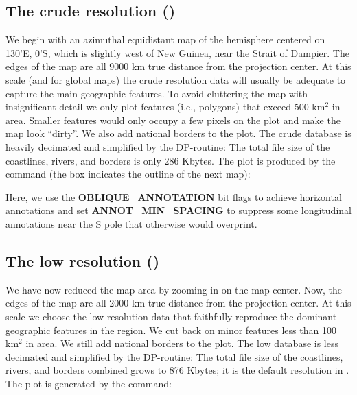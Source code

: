  

\subsection{The crude resolution ()} 

We begin with an azimuthal equidistant map of the hemisphere
centered on 130'E, 0'S, which is slightly west
of New Guinea, near the Strait of Dampier.  The edges of the
map are all 9000 km true distance from the projection center.
At this scale (and for global maps) the crude resolution data
will usually be adequate to capture the main geographic features.
To avoid cluttering the map with insignificant detail we only
plot features (i.e., polygons) that exceed 500 km$^2$ in area.
Smaller features would only occupy a few pixels on the plot and
make the map look ``dirty''.  We also add national borders to
the plot.  The crude database is heavily decimated and simplified
by the DP-routine: The total file size of the coastlines, rivers,
and borders is only 286 Kbytes.  The plot is produced by the
command (the box indicates the outline of the next map):

 


Here, we use the {\bf OBLIQUE\_ANNOTATION} bit flags to achieve
horizontal annotations and set {\bf ANNOT\_MIN\_SPACING} to suppress some longitudinal
annotations near the S pole that otherwise would overprint.


\subsection{The low resolution ()} 

We have now reduced the map area by zooming in on the map center.
Now, the edges of the map are all 2000 km true distance from
the projection center.  At this scale we choose the low resolution
data that faithfully reproduce the dominant geographic features
in the region.  We cut back on minor features less than 100 km$^2$
in area.  We still add national borders to the plot.  The low
database is less decimated and simplified by the DP-routine: The
total file size of the coastlines, rivers, and borders combined
grows to 876 Kbytes; it is the default resolution in \GMT.  The
plot is generated by the command:

